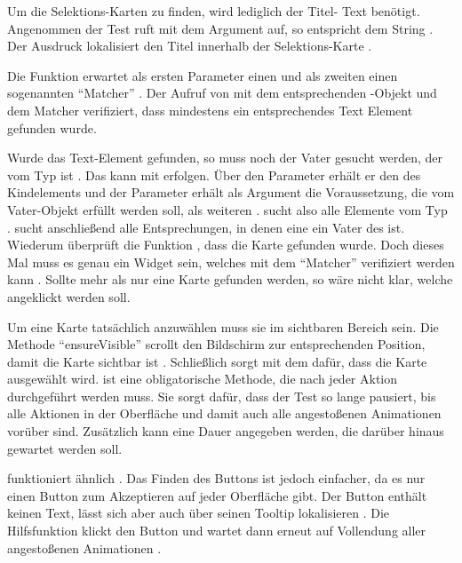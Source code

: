 Um die Selektions-Karten zu finden, wird lediglich der Titel- Text benötigt.
Angenommen der Test ruft  mit dem Argument  auf, so entspricht  dem String . Der Ausdruck  lokalisiert den Titel innerhalb der Selektions-Karte .

Die Funktion  erwartet als ersten Parameter einen  und als zweiten einen sogenannten \enquote{Matcher} .
Der Aufruf von  mit dem entsprechenden -Objekt und dem Matcher  verifiziert, dass mindestens ein entsprechendes Text Element gefunden wurde.

Wurde das Text-Element gefunden, so muss noch der Vater gesucht werden, der vom Typ  ist .
Das kann mit  erfolgen. Über den Parameter  erhält er den  des Kindelements und der Parameter  erhält als Argument die Voraussetzung, die vom Vater-Objekt erfüllt werden soll, als weiteren .  sucht also alle Elemente vom Typ .  sucht anschließend alle Entsprechungen, in denen eine  ein Vater des  ist. Wiederum überprüft die Funktion , dass die Karte gefunden wurde. Doch dieses Mal muss es genau ein Widget sein, welches mit dem \enquote{Matcher}  verifiziert werden kann . Sollte mehr als nur eine Karte gefunden werden, so wäre nicht klar, welche angeklickt werden soll.

Um eine Karte tatsächlich anzuwählen muss sie im sichtbaren Bereich sein.
Die Methode \enquote{ensureVisible} scrollt den Bildschirm zur entsprechenden Position, damit die Karte sichtbar ist .
Schließlich sorgt  mit dem   dafür, dass die Karte ausgewählt wird.   ist eine obligatorische Methode, die nach jeder Aktion durchgeführt werden muss. Sie sorgt dafür, dass der Test so lange pausiert, bis alle Aktionen in der Oberfläche und damit auch alle angestoßenen Animationen vorüber sind. Zusätzlich kann eine Dauer angegeben werden, die darüber hinaus gewartet werden soll. 

 funktioniert ähnlich \Lst{\ref{lst:Schritt1HilfsmethodeTabSelectionCard}}.
Das Finden des Buttons ist jedoch einfacher, da es nur einen Button zum Akzeptieren auf jeder Oberfläche gibt.
Der Button enthält keinen Text, lässt sich aber auch über seinen Tooltip lokalisieren .
Die Hilfsfunktion klickt den Button  und wartet dann erneut auf Vollendung aller angestoßenen Animationen .

